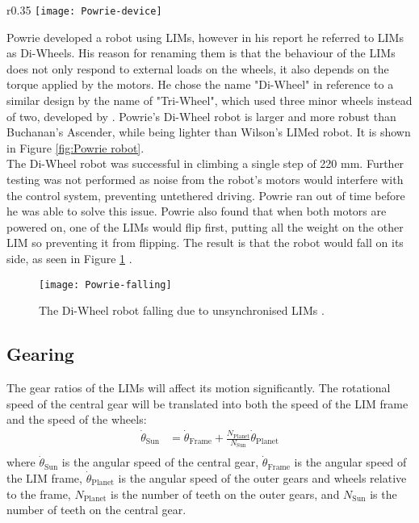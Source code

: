 \begin{wrapfigure}{r}{0.35\textwidth}
	\centering
	\texttt{[image: Powrie-device]}
	\caption{Powrie's Di-Wheel Robot \citep{Powrie-2019}.}
	\label{fig:Powrie robot}
\end{wrapfigure}
Powrie developed a robot using LIMs, however in his report he referred to LIMs as Di-Wheels. His reason for renaming them is that the behaviour of the LIMs does not only respond to external loads on the wheels, it also depends on the torque applied by the motors. He chose the name "Di-Wheel" in reference to a similar design by the name of "Tri-Wheel", which used three minor wheels instead of two, developed by \cite{Smith-2015}. Powrie's Di-Wheel robot is larger and more robust than Buchanan's Ascender, while being lighter than Wilson's LIMed robot. It is shown in Figure \ref{fig:Powrie robot}.\\


The Di-Wheel robot was successful in climbing a single step of 220 mm. Further testing was not performed as noise from the robot's motors would interfere with the control system, preventing untethered driving. Powrie ran out of time before he was able to solve this issue. Powrie also found that when both motors are powered on, one of the LIMs would flip first, putting all the weight on the other LIM so preventing it from flipping. The result is that the robot would fall on its side, as seen in Figure \ref{Powrie falling} \citep{Powrie-2019}.\\
\begin{figure}[ht]
	\centering
	\texttt{[image: Powrie-falling]}
	\caption{The Di-Wheel robot falling due to unsynchronised LIMs \citep{Powrie-2019}.}
	\label{Powrie falling}
\end{figure}


\subsection{Gearing} %
The gear ratios of the LIMs will affect its motion significantly. The rotational speed of the central gear will be translated into both the speed of the LIM frame and the speed of the wheels:
\begin{align*}
	\dot{\theta}_{\mathrm{Sun}} &= \dot{\theta}_{\mathrm{Frame}} + \frac{N_\mathrm{Planet}}{N_\mathrm{Sun}}\dot{\theta}_{\mathrm{Planet}} \tag{1}\\
\end{align*}
where $\dot{\theta}_{\mathrm{Sun}}$ is the angular speed of the central gear, $\dot{\theta}_{\mathrm{Frame}}$ is the angular speed of the LIM frame, $\dot{\theta}_{\mathrm{Planet}}$ is the angular speed of the outer gears and wheels relative to the frame, $N_{\mathrm{Planet}}$ is the number of teeth on the outer gears, and $N_\mathrm{Sun}$ is the number of teeth on the central gear.\\

